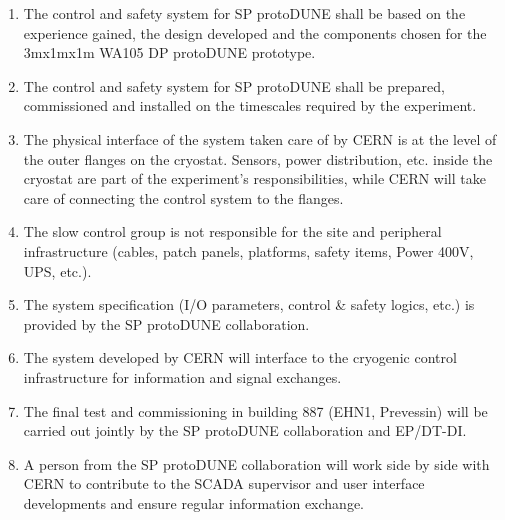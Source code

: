
\begin{enumerate}
\item	The control and safety system for SP protoDUNE shall be based on the experience gained, the design developed and the 
components chosen for the 3mx1mx1m WA105 DP protoDUNE prototype.
\item	The control and safety system for SP protoDUNE shall be prepared, commissioned and installed on the timescales 
required by the experiment.

\item	The physical interface of the system taken care of by CERN is at the level of the outer flanges on the cryostat. 
Sensors, power distribution, etc. inside the cryostat are part of the experiment's responsibilities, while CERN will take 
care of connecting the control system to the flanges.
\item	The slow control group is not responsible for the site and peripheral infrastructure (cables, patch panels, 
platforms, safety items, Power 400V, UPS, etc.).
\item	The system specification (I/O parameters, control \& safety logics, etc.) is provided by the SP protoDUNE 
collaboration.
\item	The system developed by CERN will interface to the cryogenic control infrastructure for information and signal 
exchanges. 
\item	The final test and commissioning in building 887 (EHN1, Prevessin) will be carried out jointly by the SP protoDUNE 
collaboration and EP/DT-DI.
\item	A person from the SP protoDUNE collaboration will work side by side with CERN to contribute to the SCADA 
supervisor and user interface developments and ensure regular information exchange.


\end{enumerate}
